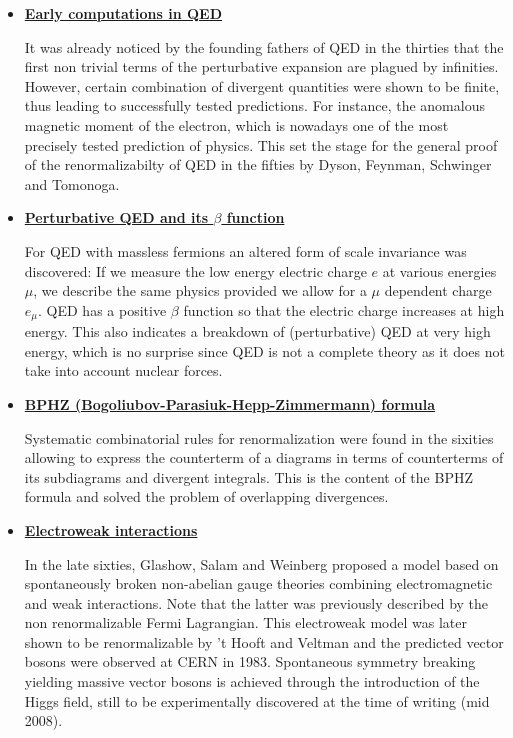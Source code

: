 \documentclass[10pt,here,feynmf]{article}
\begin{document}
\begin{itemize}
\item
\underline{\bf Early computations in QED}

It was already noticed by the founding fathers of QED in the thirties that the first non trivial terms of the perturbative expansion are plagued by infinities. However, certain combination of divergent quantities were shown to be finite, thus leading to successfully tested predictions. For instance, the anomalous magnetic moment of the electron, which is nowadays one of the most precisely tested prediction of physics. This set the stage for the general proof of the renormalizabilty of QED in the fifties by  Dyson, Feynman, Schwinger and Tomonoga.

\item
\underline{\bf Perturbative QED  and its $\beta$ function}

For QED with massless fermions an altered form of scale invariance was discovered: If we measure the low energy electric charge $e$ at various energies $\mu$, we describe the same physics provided we allow for a $\mu$ dependent charge $e_{\mu}$. QED has a positive $\beta$ function so that the electric charge increases at high energy. This also indicates a breakdown of (perturbative) QED at very high energy, which is no surprise since QED is not a complete theory as it does not take into account nuclear forces.

\item
\underline{\bf BPHZ (Bogoliubov-Parasiuk-Hepp-Zimmermann) formula}
 
Systematic  combinatorial rules for renormalization were found in the sixities allowing to express the counterterm of a diagrams in terms of counterterms of  its subdiagrams and divergent integrals. This is the content of the BPHZ formula and solved the problem of overlapping divergences.

\item
\underline{\bf Electroweak interactions}

In the late sixties, Glashow, Salam and Weinberg proposed a model based on spontaneously broken non-abelian gauge theories combining electromagnetic and weak interactions. Note that the latter was previously described by the non renormalizable Fermi Lagrangian. This electroweak model was later shown to be renormalizable by 't Hooft and Veltman and the predicted vector bosons were observed at CERN in 1983. Spontaneous symmetry breaking yielding massive vector bosons is achieved through the introduction of the Higgs field, still to be experimentally discovered at the time of writing (mid 2008). 


\end{itemize}
\end{document}
